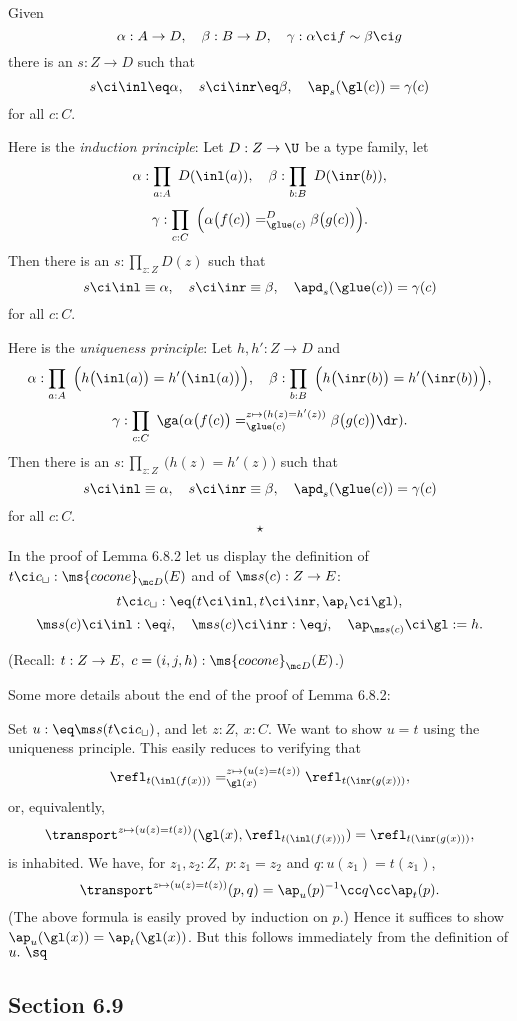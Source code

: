 \documentclass[12pt]{article}
\begin{document}
Given 
$$
\alpha:A\to D,\quad\beta:B\to D,\quad\gamma:\alpha\ci f\sim\beta\ci g
$$ 
there is an $s:Z\to D$ such that 
$$
s\ci\inl\eq\alpha,\quad s\ci\inr\eq\beta,\quad\ap_s(\gl(c))=\gamma(c)
$$ 
for all $c:C$.

Here is the \emph{induction principle}: Let $D:Z\to\U$ be a type family, let 
$$
\alpha:\prod_{a:A}\ D(\inl(a)),\quad\beta:\prod_{b:B}\ D(\inr(b)),
$$
$$
\gamma:\prod_{c:C}\ \Big(\alpha\big(f(c)\big)=^D_{\glue(c)}\beta\big(g(c)\big)\Big).
$$ 
Then there is an $s:\prod_{z:Z}D(z)$ such that 
$$
s\ci\inl\equiv\alpha,\quad s\ci\inr\equiv\beta,\quad\apd_s(\glue(c))=\gamma(c)
$$ 
for all $c:C$. 

Here is the \emph{uniqueness principle}: Let $h,h':Z\to D$ and 
$$
\alpha:\prod_{a:A}\ \Big(h\big(\inl(a)\big)=h'\big(\inl(a)\big)\Big),\quad\beta:\prod_{b:B}\ \Big(h\big(\inr(b)\big)=h'\big(\inr(b)\big)\Big),
$$
$$
\gamma:\prod_{c:C}\ \ga(\alpha\big(f(c)\big)=^{z\mapsto(h(z)=h'(z))}_{\glue(c)}\beta\big(g(c)\big)\dr).
$$ 
Then there is an $s:\prod_{z:Z}\ \big(h(z)=h'(z)\big)$ such that 
$$
s\ci\inl\equiv\alpha,\quad s\ci\inr\equiv\beta,\quad\apd_s(\glue(c))=\gamma(c)
$$ 
for all $c:C$.  
$$
\star
$$

In the proof of Lemma 6.8.2 let us display the definition of $t\ci c_{\sqcup}:\ms{cocone}_{\mc D}(E)$ and of $\ms s(c):Z\to E$: 
$$
t\ci c_{\sqcup}:\eq(t\ci\inl,t\ci\inr,\ap_t\ci\gl),
$$ 
$$
\ms s(c)\ci\inl:\eq i,\quad\ms s(c)\ci\inr :\eq j,\quad\ap_{\ms s(c)}\ci\gl:=h.
$$ 

\nn(Recall: $t:Z\to E,\ c=(i,j,h):\ms{cocone}_{\mc D}(E)$.)

Some more details about the end of the proof of Lemma 6.8.2:

Set $u:\eq\ms s(t\ci c_\sqcup)$, and let $z:Z,\ x:C$. We want to show $u=t$ using the uniqueness principle. This easily reduces to verifying that 
$$
\refl_{t(\inl(f(x)))}=_{\gl(x)}^{z\mapsto(u(z)=t(z))}\refl_{t(\inr(g(x)))},
$$ 
or, equivalently, 
$$
\transport^{z\mapsto(u(z)=t(z))}(\gl(x),\refl_{t(\inl(f(x)))})=\refl_{t(\inr(g(x)))},
$$ 
is inhabited. We have, for $z_1,z_2:Z,\ p:z_1=z_2$ and $q:u(z_1)=t(z_1)$, 
$$
\transport^{z\mapsto(u(z)=t(z))}(p,q)=\ap_u(p)^{-1}\cc q\cc\ap_t(p).
$$ 
(The above formula is easily proved by induction on $p$.) Hence it suffices to show $\ap_u(\gl(x))=\ap_t(\gl(x))$. But this follows immediately from the definition of $u.\ \sq$


\subsection{Section 6.9}\label{69}
\end{document}

